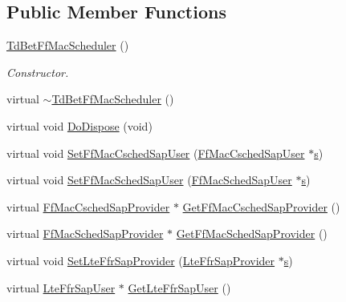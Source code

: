 \subsection*{Public Member Functions}
\begin{DoxyCompactItemize}
\item 
\hyperlink{classns3_1_1TdBetFfMacScheduler_a9a3f1388b933f153fecdc65c10f7924e}{Td\+Bet\+Ff\+Mac\+Scheduler} ()
\begin{DoxyCompactList}\small\item\em Constructor. \end{DoxyCompactList}\item 
virtual \hyperlink{classns3_1_1TdBetFfMacScheduler_ac3bce99ab4dcfcdcd6ea29c0ee33d0da}{$\sim$\+Td\+Bet\+Ff\+Mac\+Scheduler} ()
\item 
virtual void \hyperlink{classns3_1_1TdBetFfMacScheduler_af4a7dc1adfe243c4b73b8fba9d3ab1f1}{Do\+Dispose} (void)
\item 
virtual void \hyperlink{classns3_1_1TdBetFfMacScheduler_a4fb2040e19ce8bf1141fe2dbcdb144ed}{Set\+Ff\+Mac\+Csched\+Sap\+User} (\hyperlink{classns3_1_1FfMacCschedSapUser}{Ff\+Mac\+Csched\+Sap\+User} $\ast$\hyperlink{generate__test__data__lte__sinr_8m_ad83eeb3a142285d1243a08c6b7026df8}{s})
\item 
virtual void \hyperlink{classns3_1_1TdBetFfMacScheduler_a7b2928319ee3ba4e1fbd03ffe7908b75}{Set\+Ff\+Mac\+Sched\+Sap\+User} (\hyperlink{classns3_1_1FfMacSchedSapUser}{Ff\+Mac\+Sched\+Sap\+User} $\ast$\hyperlink{generate__test__data__lte__sinr_8m_ad83eeb3a142285d1243a08c6b7026df8}{s})
\item 
virtual \hyperlink{classns3_1_1FfMacCschedSapProvider}{Ff\+Mac\+Csched\+Sap\+Provider} $\ast$ \hyperlink{classns3_1_1TdBetFfMacScheduler_adba6ce38802e9ca05e37eebda5e77976}{Get\+Ff\+Mac\+Csched\+Sap\+Provider} ()
\item 
virtual \hyperlink{classns3_1_1FfMacSchedSapProvider}{Ff\+Mac\+Sched\+Sap\+Provider} $\ast$ \hyperlink{classns3_1_1TdBetFfMacScheduler_aef6231295d6587e9f91ed14a79dea2aa}{Get\+Ff\+Mac\+Sched\+Sap\+Provider} ()
\item 
virtual void \hyperlink{classns3_1_1TdBetFfMacScheduler_ae13bfa9442c59c4102f3f74addaec577}{Set\+Lte\+Ffr\+Sap\+Provider} (\hyperlink{classns3_1_1LteFfrSapProvider}{Lte\+Ffr\+Sap\+Provider} $\ast$\hyperlink{generate__test__data__lte__sinr_8m_ad83eeb3a142285d1243a08c6b7026df8}{s})
\item 
virtual \hyperlink{classns3_1_1LteFfrSapUser}{Lte\+Ffr\+Sap\+User} $\ast$ \hyperlink{classns3_1_1TdBetFfMacScheduler_a710980ec9ba363e5946b49132a25153f}{Get\+Lte\+Ffr\+Sap\+User} ()

\end{DoxyCompactItemize}
